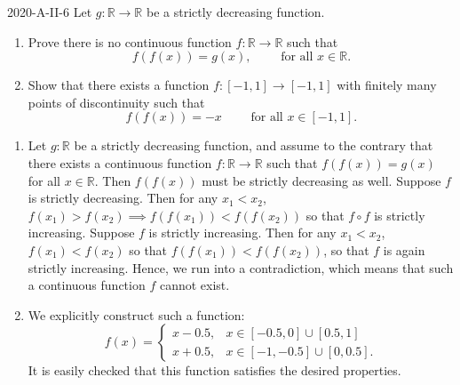 \documentclass{article}
\begin{document}
	\begin{prb}{2020-A-II-6}
		Let $g: \mathbb{R} \to \mathbb{R}$ be a strictly decreasing function. \vspace{-0.35cm}
		\begin{enumerate}[itemsep =-2pt,label = (\alph{*})]
			\item Prove there is no continuous function $f: \mathbb{R} \to \mathbb{R}$ such that 
			\begin{equation*}
				f(f(x)) = g(x), \qquad \text{ for all $x \in \mathbb{R}$}. 
			\end{equation*}
			\item Show that there exists a function $f: [-1,1] \to [-1,1]$ with finitely many points of discontinuity such that $$f(f(x)) =-x \qquad \text{ for all $x \in [-1,1]$}.$$
		\end{enumerate}
	\end{prb}
		\vspace{-0.65cm}
		\begin{enumerate}[itemsep =-2pt,label = (\alph{*})]
			\item Let $g: \mathbb{R}$ be a strictly decreasing function, and assume to the contrary that there exists a continuous function $f: \mathbb{R} \to \mathbb{R}$ such that $f(f(x)) = g(x)$ for all $x \in \mathbb{R}$. Then $f(f(x))$ must be strictly decreasing as well. Suppose $f$ is strictly decreasing. Then for any $x_{1} < x_{2}$, $f(x_{1}) > f(x_{2}) \implies f(f(x_{1})) < f(f(x_{2}))$ so that $f \circ f$ is strictly increasing. Suppose $f$ is strictly increasing. Then for any $x_{1} < x_{2}$, $f(x_{1}) < f(x_{2})$ so that $f(f(x_{1})) < f(f(x_{2}))$, so that $f$ is again strictly increasing. Hence, we run into a contradiction, which means that such a continuous function $f$ cannot exist. 
			\item We explicitly construct such a function: 
			\begin{equation}
				f(x) = 
				\begin{cases}
					x - 0.5, & x \in [-0.5, 0] \cup [0.5,1] \\
					x + 0.5, & x \in [-1,-0.5] \cup [0,0.5]. 
				\end{cases}
			\end{equation}
			It is easily checked that this function satisfies the desired properties.
		\end{enumerate}
	
\end{document}
